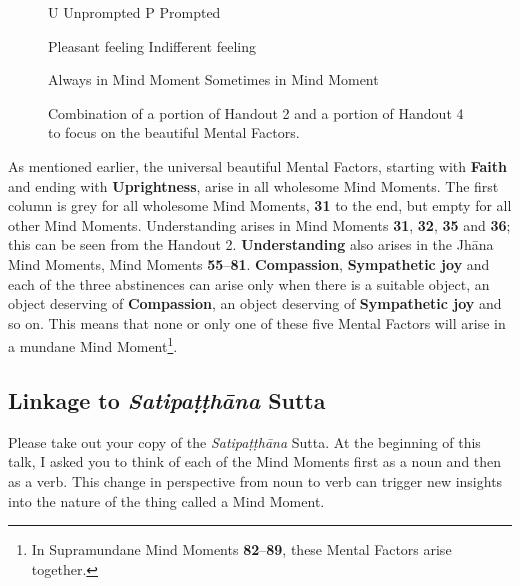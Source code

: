\begin{figure}[H]
\begin{center}
\noindent
U \hspace{2mm} Unprompted\hspace{5mm} P \hspace{2mm} Prompted

\smiley \hspace {2mm} Pleasant feeling \hspace{5mm} \neutral \hspace{2mm} Indifferent feeling

\tmsmall \hspace{2mm} Always in Mind Moment\hspace{5mm} \lcsmall \hspace{2mm} Sometimes in Mind Moment

\end{center}

\caption{Combination of a portion of Handout 2 and a portion of Handout 4 to focus on the beautiful Mental Factors.}
\label{fig:Wholesome}
\end{figure}

As mentioned earlier, the universal beautiful Mental Factors, starting with \textbf{Faith} and ending with \textbf{Uprightness}, arise in all wholesome Mind Moments. The first column is grey for all wholesome Mind Moments, \textbf{31} to the end, but empty for all other Mind Moments. Understanding arises in Mind Moments \textbf{31}, \textbf{32}, \textbf{35} and \textbf{36}; this can be seen from the Handout 2. \textbf{Understanding} also arises in the Jhāna Mind Moments, Mind Moments \textbf{55}--\textbf{81}. \textbf{Compassion}, \textbf{Sympathetic joy} and each of the three abstinences can arise only when there is a suitable object, an object deserving of \textbf{Compassion}, an object deserving of \textbf{Sympathetic joy} and so on. This means that none or only one of these five Mental Factors will arise in a mundane Mind Moment\footnote{In Supramundane Mind Moments \textbf{82}--\textbf{89}, these Mental Factors arise together.}.

\subsection*{Linkage to \textit{Satipaṭṭhāna} Sutta}

Please take out your copy of the \textit{Satipaṭṭhāna} Sutta. At the beginning of this talk, I asked you to think of each of the Mind Moments first as a noun and then as a verb. This change in perspective from noun to verb can trigger new insights into the nature of the thing called a Mind Moment.

